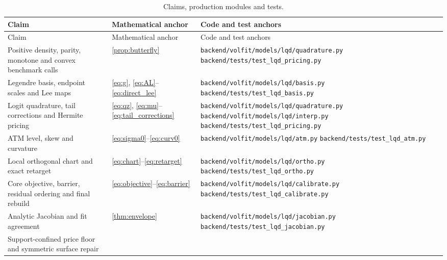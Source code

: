 \documentclass[11pt]{article}
\begin{document}
\begin{longtable}{@{}p{}p{}p{}@{}}
\caption{Claims, production modules and tests.}\label{tab:traceability}\\
\toprule
Claim & Mathematical anchor & Code and test anchors\\
\midrule
\endfirsthead
\toprule
Claim & Mathematical anchor & Code and test anchors\\
\midrule
\endhead
Positive density, parity, monotone and convex benchmark calls &
\cref{prop:butterfly} &
\nolinkurl{backend/volfit/models/lqd/quadrature.py}\newline
\nolinkurl{backend/tests/test_lqd_pricing.py}\\
\addlinespace
Legendre basis, endpoint scales and Lee maps &
\eqref{eq:g}, \eqref{eq:AL}--\eqref{eq:direct_lee} &
\nolinkurl{backend/volfit/models/lqd/basis.py}\newline
\nolinkurl{backend/tests/test_lqd_basis.py}\\
\addlinespace
Logit quadrature, tail corrections and Hermite pricing &
\eqref{eq:qz}, \eqref{eq:mu}--\eqref{eq:tail_corrections} &
\nolinkurl{backend/volfit/models/lqd/quadrature.py}\newline
\nolinkurl{backend/volfit/models/lqd/interp.py}\newline
\nolinkurl{backend/tests/test_lqd_pricing.py}\\
\addlinespace
ATM level, skew and curvature &
\eqref{eq:sigma0}--\eqref{eq:curv0} &
\nolinkurl{backend/volfit/models/lqd/atm.py}\newline
\nolinkurl{backend/tests/test_lqd_atm.py}\\
\addlinespace
Local orthogonal chart and exact retarget &
\eqref{eq:chart}--\eqref{eq:retarget} &
\nolinkurl{backend/volfit/models/lqd/ortho.py}\newline
\nolinkurl{backend/tests/test_lqd_ortho.py}\\
\addlinespace
Core objective, barrier, residual ordering and final rebuild &
\eqref{eq:objective}--\eqref{eq:barrier} &
\nolinkurl{backend/volfit/models/lqd/calibrate.py}\newline
\nolinkurl{backend/tests/test_lqd_calibrate.py}\\
\addlinespace
Analytic Jacobian and fit agreement &
\cref{thm:envelope} &
\nolinkurl{backend/volfit/models/lqd/jacobian.py}\newline
\nolinkurl{backend/tests/test_lqd_jacobian.py}\\
\addlinespace
Support-confined price floor and symmetric surface repair &

\end{longtable}
\end{document}

